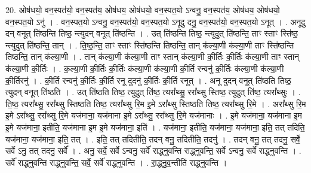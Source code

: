 \documentclass[17pt]{extarticle}
\begin{document}
20. ओष॑धयो॒ वन॒स्पत॑यो॒ वन॒स्पत॑य॒ ओष॑धय॒ ओष॑धयो॒ वन॒स्पत॒यो ऽन्वनु॒ वन॒स्पत॑य॒ ओष॑धय॒ ओष॑धयो॒ वन॒स्पत॒यो ऽनु॑ । . वन॒स्पत॒यो ऽन्वनु॒ वन॒स्पत॑यो॒ वन॒स्पत॒यो ऽनूदु दनु॒ वन॒स्पत॑यो॒ वन॒स्पत॒यो ऽनूत् । . अनूदु दन् वनूत् ति॑ष्ठन्ति तिष्ठ॒ न्त्युदन् वनूत् ति॑ष्ठन्ति । . उत् ति॑ष्ठन्ति तिष्ठ॒ न्त्युदुत् ति॑ष्ठन्ति॒ ताꣳ स्ताꣳ स्ति॑ष्ठ॒ न्त्युदुत् ति॑ष्ठन्ति॒ तान् । . ति॒ष्ठ॒न्ति॒ ताꣳ स्ताꣳ स्ति॑ष्ठन्ति तिष्ठन्ति॒ तान् क॑ल्या॒णी क॑ल्या॒णी ताꣳ स्ति॑ष्ठन्ति तिष्ठन्ति॒ तान् क॑ल्या॒णी । . तान् क॑ल्या॒णी क॑ल्या॒णी ताꣳ स्तान् क॑ल्या॒णी की॒र्तिः की॒र्तिः क॑ल्या॒णी ताꣳ स्तान् क॑ल्या॒णी की॒र्तिः । . क॒ल्या॒णी की॒र्तिः की॒र्तिः क॑ल्या॒णी क॑ल्या॒णी की॒र्ति रन्वनु॑ की॒र्तिः क॑ल्या॒णी क॑ल्या॒णी की॒र्तिरनु॑ । . की॒र्ति रन्वनु॑ की॒र्तिः की॒र्ति रनू दुदनु॑ की॒र्तिः की॒र्ति रनूत् । . अनू दुदन् वनूत् ति॑ष्ठति तिष्ठ॒ त्युदन् वनूत् ति॑ष्ठति । . उत् ति॑ष्ठति तिष्ठ॒ त्युदुत् ति॑ष्ठ॒ त्यरा᳚थ्सु॒ ररा᳚थ्सु स्तिष्ठ॒ त्युदुत् ति॑ष्ठ॒ त्यरा᳚थ्सुः । . ति॒ष्ठ॒ त्यरा᳚थ्सु॒ ररा᳚थ्सु स्तिष्ठति तिष्ठ॒ त्यरा᳚थ्सु रि॒म इ॒मे ऽरा᳚थ्सु स्तिष्ठति तिष्ठ॒ त्यरा᳚थ्सु रि॒मे । . अरा᳚थ्सु रि॒म इ॒मे ऽरा᳚थ्सु॒ ररा᳚थ्सु रि॒मे यज॑माना॒ यज॑माना इ॒मे ऽरा᳚थ्सु॒ ररा᳚थ्सु रि॒मे यज॑मानाः । . इ॒मे यज॑माना॒ यज॑माना इ॒म इ॒मे यज॑माना॒ इतीति॒ यज॑माना इ॒म इ॒मे यज॑माना॒ इति॑ । . यज॑माना॒ इतीति॒ यज॑माना॒ यज॑माना॒ इति॒ तत् तदिति॒ यज॑माना॒ यज॑माना॒ इति॒ तत् । . इति॒ तत् तदितीति॒ तदन् वनु॒ तदितीति॒ तदनु॑ । . तदन् वनु॒ तत् तदनु॒ सर्वे॒ सर्वे ऽनु॒ तत् तदनु॒ सर्वे᳚ । . अनु॒ सर्वे॒ सर्वे ऽन्वनु॒ सर्वे॑ राद्ध्नुवन्ति राद्ध्नुवन्ति॒ सर्वे ऽन्वनु॒ सर्वे॑ राद्ध्नुवन्ति । . सर्वे॑ राद्ध्नुवन्ति राद्ध्नुवन्ति॒ सर्वे॒ सर्वे॑ राद्ध्नुवन्ति । . रा॒द्ध्नु॒व॒न्तीति॑ राद्ध्नुवन्ति । \newline
\pagebreak
{}
\end{document}

